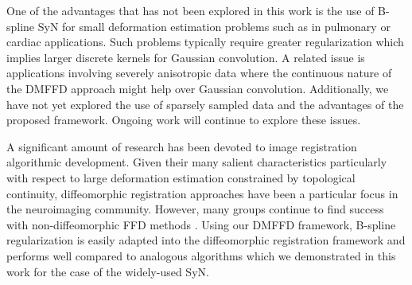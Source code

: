 \documentclass{frontiersSCNS}
\begin{document}
One of the advantages that has not been explored in this work is 
the use of B-spline SyN for small deformation estimation problems such 
as in pulmonary or cardiac applications.  Such problems typically require
greater regularization which implies larger discrete kernels for 
Gaussian convolution.
A related issue is applications involving severely anisotropic data where
the continuous nature of the DMFFD approach might help over Gaussian convolution.
Additionally, we have not yet explored the use of sparsely sampled data 
and the advantages of the proposed framework.
Ongoing work will continue to explore these issues.

A significant amount of research has been devoted to image registration
algorithmic development.  Given their many salient characteristics particularly with
respect to large deformation estimation constrained by topological 
continuity, diffeomorphic registration
approaches have been a particular focus in the neuroimaging community.
However, many groups continue to find success with non-diffeomorphic
FFD methods
\citep[e.g.][]{rueckert1999,klein2010}.  Using our DMFFD framework, 
B-spline regularization is easily adapted into the diffeomorphic registration 
framework and performs well compared to analogous algorithms which we demonstrated 
in this work for the case of the widely-used SyN.








\end{document}
